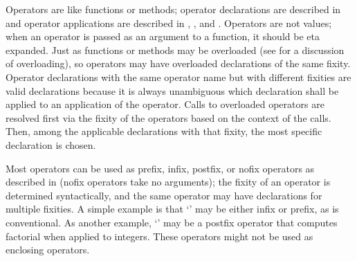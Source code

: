 %
%
%
%



Operators are like functions or methods; operator declarations are
described in  and operator applications are
described in , , and
.
Operators are not values; when an operator is passed as an argument to a
function, it should be eta expanded.
Just as functions or methods may be overloaded (see
 for a discussion of overloading),
so operators may have overloaded declarations of the same fixity.
Operator declarations with the same operator name but with different fixities
are valid declarations because it is always unambiguous which declaration
shall be applied to an application of the operator.
Calls to overloaded operators are resolved first via the
fixity of the operators based on the context of the calls.
Then, among the applicable declarations with that fixity,
the most specific declaration is chosen.

Most operators can be used as prefix, infix, postfix, or
nofix operators as described in 
(nofix operators take no arguments);
the fixity of an operator is determined syntactically,
and the same operator may have declarations for multiple fixities.
A simple example is that `\EXP{-}' may be either infix or prefix,
as is conventional.
As another example, `\EXP{!}' may be a
postfix operator that computes factorial when applied to integers.
These operators might not be used as enclosing operators.


